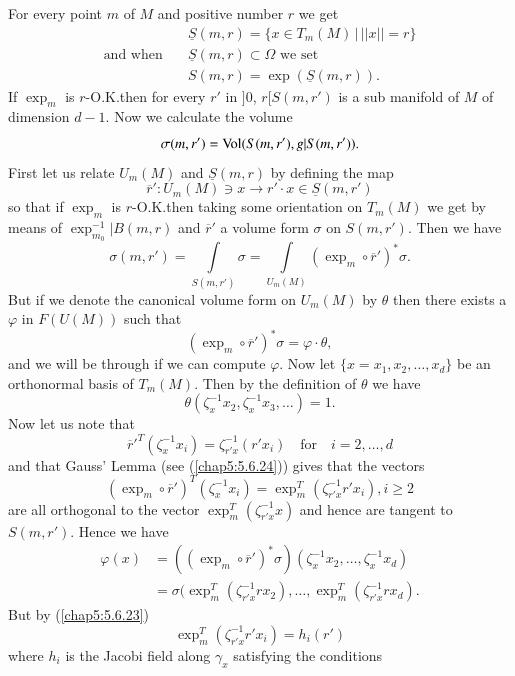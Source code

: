 For every point $m$ of $M$ and positive number $r$ we get
\begin{align*}
& \underline{S}(m,r)=\{x\in T_{m}(M)\,\big|\,||x||=r\}\\
\text{and when}\quad & \underline{S}(m,r)\subset \Omega\text{ \ we
  set}\\
& S(m,r)=\exp(\underline{S}(m,r)).
\end{align*}
If $\exp_{m}$ is $r$-O.K.\@ then for every $r'$ in $]0$, $r[S(m,r')$
      is a sub manifold of $M$ of dimension $d-1$. Now we calculate the
      volume\pageoriginale
$$
\sigma(m,r')=\operatorname{Vol}(S(m,r'),g|S(m,r')).
$$
First let us relate $U_{m}(M)$ and $\underline{S}(m,r)$ by defining
the map
$$
\overline{r}':U_{m}(M)\ni x\to r'\cdot x\in\underline{S}(m,r')
$$
so that if $\exp_{m}$ is $r$-O.K.\@ then taking some orientation on
$T_{m}(M)$ we get by means of $\exp^{-1}_{m_{0}}|B(m,r)$ and
$\overline{r}'$ a volume form $\sigma$ on $S(m,r')$. Then we have
$$
\sigma(m,r')=\int\limits_{S(m,r')}\sigma=\int\limits_{U_{m}(M)}(\exp_{m}\circ
\overline{r}')^{\ast}\sigma. 
$$
But if we denote the canonical volume form on $U_{m}(M)$ by $\theta$
then there exists a $\varphi$ in $F(U(M))$ such that
\begin{equation*}
(\exp_{m}\circ \overline{r}')^{\ast}\sigma = \varphi\cdot
  \theta,\tag{6.8.1}\label{chap6:6.8.1} 
\end{equation*}
and we will be through if we can compute $\varphi$. Now let
$\{x=x_{1},x_{2},\ldots,x_{d}\}$ be an orthonormal basis of
$T_{m}(M)$. Then by the definition of $\theta$ we have
$$
\theta(\zeta^{-1}_{x}x_{2},\zeta^{-1}_{x}x_{3},\ldots)=1.
$$
Now let us note that
$$
{\overline{r}'}^{T}(\zeta^{-1}_{x}x_{i})=\zeta^{-1}_{r'x}(r'x_{i})\quad\text{for}\quad
i=2,\ldots,d
$$
and that Gauss' Lemma (see (\ref{chap5:5.6.24})) gives that the
vectors
$$
(\exp_{m}\circ
\overline{r}')^{T}(\zeta^{-1}_{x}x_{i})=\exp^{T}_{m}(\zeta^{-1}_{r'x}r'x_{i}),i\geq
2
$$
are all orthogonal to the vector $\exp^{T}_{m}(\zeta^{-1}_{r'x}x)$ and
hence are tangent to\pageoriginale\break $S(m,r')$. Hence we have
\begin{align*}
\varphi(x) &= ((\exp_{m}\circ
\overline{r}')^{\ast}\sigma)(\zeta^{-1}_{x}x_{2},\ldots,\zeta^{-1}_{x}x_{d})\\
&=
\sigma(\exp^{T}_{m}(\zeta^{-1}_{r'x}rx_{2}),\ldots,\exp^{T}_{m}(\zeta^{-1}_{r'x}rx_{d}). 
\end{align*}
But by (\ref{chap5:5.6.23})
$$
\exp^{T}_{m}(\zeta^{-1}_{r'x}r'x_{i})=h_{i}(r')
$$
where $h_{i}$ is the Jacobi field along $\gamma_{x}$ satisfying the
conditions
